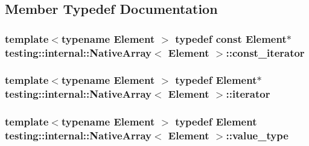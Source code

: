\subsection{Member Typedef Documentation}
\hypertarget{classtesting_1_1internal_1_1_native_array_a9ce7c8408460d7158a2870456d134557}{
\subsubsection[{const\+\_\+iterator}]{\setlength{\rightskip}{0pt plus 5cm}template$<$typename Element $>$ typedef const Element$\ast$ {\bf testing\+::internal\+::\+Native\+Array}$<$ Element $>$\+::{\bf const\+\_\+iterator}}}\label{classtesting_1_1internal_1_1_native_array_a9ce7c8408460d7158a2870456d134557}
\hypertarget{classtesting_1_1internal_1_1_native_array_ac1301a57977b57a1ad013e4e25fc2a72}{
\subsubsection[{iterator}]{\setlength{\rightskip}{0pt plus 5cm}template$<$typename Element $>$ typedef Element$\ast$ {\bf testing\+::internal\+::\+Native\+Array}$<$ Element $>$\+::{\bf iterator}}}\label{classtesting_1_1internal_1_1_native_array_ac1301a57977b57a1ad013e4e25fc2a72}
\hypertarget{classtesting_1_1internal_1_1_native_array_a12216d686e16e4cc63d952fada5b2ba9}{
\subsubsection[{value\+\_\+type}]{\setlength{\rightskip}{0pt plus 5cm}template$<$typename Element $>$ typedef Element {\bf testing\+::internal\+::\+Native\+Array}$<$ Element $>$\+::{\bf value\+\_\+type}}}\label{classtesting_1_1internal_1_1_native_array_a12216d686e16e4cc63d952fada5b2ba9}


